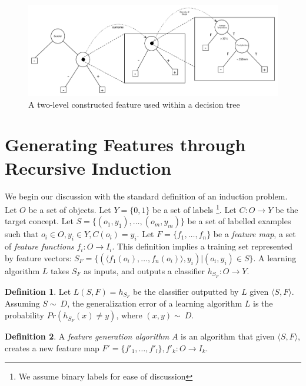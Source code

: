 \documentclass[twoside,11pt]{article}
\theoremstyle{definition}
\newtheorem{defn}{Definition}[section]
\begin{document}
\begin{figure}[t]
	\centering
	\includegraphics[width=\linewidth]{fig3.pdf}
	\caption{A two-level constructed feature used within a decision tree}
	\label{fig:lvl2_tree}
\end{figure}

\section{Generating Features through Recursive Induction} \label{formal}

We begin our discussion with the standard definition of an induction problem. 
Let $O$ be a set of objects. Let $Y=\{0,1\}$ be a set of labels \footnote{We assume binary labels for ease of discussion}. Let $C:O\rightarrow Y$ be the target concept. Let $S=\{(o_{1},y_{1}),\ldots,(o_{m},y_{m})\}$ be a set of labelled examples such that $o_{i}\in O, y_{i}\in Y, C(o_i)=y_i$. 
Let $F=\{f_{1},\ldots,f_{n}\}$ be a \emph{feature map}, a set of \emph{feature functions} $f_{i}:O\rightarrow I_{i}$.  This definition implies a training set represented by feature vectors: $S_F=\{ (\langle f_1(o_i),\ldots,f_n(o_i)\rangle, y_i) | (o_i,y_i) \in S\}$. A learning algorithm $L$ takes $S_F$ as inputs, and outputs a classifier $h_{S_F}:O\rightarrow Y$.
\begin{defn}
	Let $L(S,F)=h_{S_F}$ be the classifier outputted by $L$ given $\langle S,F\rangle$. Assuming $S\sim\ D$, the generalization error of a learning algorithm $L$ is the probability $Pr(h_{S_F}(x)\neq y)$, where $(x,y)\sim\ D$.
\end{defn}

\begin{defn}
	A \emph{feature generation algorithm} $A$ is an algorithm that given $\langle S,F\rangle$, creates a new feature map $F'=\{f'_{1},\ldots,f'_{l}\}, f'_{k}:O\rightarrow I_k$.
\end{defn}
\end{document}
